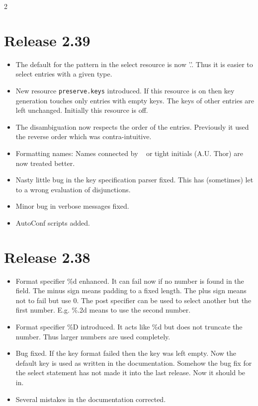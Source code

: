 \documentclass[11pt,a4paper]{scrartcl}
\newcommand\rsc[1]{\texttt{#1}}
\newenvironment{Releases}{\begin{multicols}2\RaggedRight}{\end{multicols}}
\newenvironment{Release}[2]{%
  \def\tmp{#2}%
  \section*{Release #1 \ifx\tmp\empty\else{\normalsize[#2]}\fi}
  \begin{itemize}
}{\end{itemize}}
\newenvironment{Fix}[1]{\item }{}
\newenvironment{New}[1]{\item }{}
\newenvironment{Doc}[1]{\item }{}
\newenvironment{Update}[1]{\item }{}
\begin{document}
\begin{Releases}
 \begin{Release}{2.39}{}
  \begin{Update}{gene}
    The default for the pattern in the select resource is now '.'.
    Thus it is easier to select entries with a given type.
  \end{Update}
  \begin{New}{gene}
    New resource \rsc{preserve.keys} introduced. If this resource is on
    then key generation touches only entries with empty keys. The keys of
    other entries are left unchanged. Initially this resource is off.
  \end{New}
  \begin{Update}{gene}
    The disambiguation now respects the order of the entries. Previously it
    used the reverse order which was contra-intuitive.
  \end{Update}
  \begin{Update}{gene}
    Formatting names: Names connected by ~ or tight initials (A.U. Thor) are
    now treated better.
  \end{Update}
  \begin{Fix}{gene}
    Nasty little bug in the key specification parser fixed. This has
    (sometimes) let to a wrong evaluation of disjunctions.
  \end{Fix}
  \begin{Fix}{gene}
    Minor bug in verbose messages fixed.
  \end{Fix}
  \begin{New}{gene}
    AutoConf scripts added.
  \end{New}
 \end{Release}

 \begin{Release}{2.38}{}
  \begin{New}{gene}
    Format specifier \%d enhanced. It can fail now if no number is found in
    the field. The minus sign means padding to a fixed length. The plus sign
    means not to fail but use 0. The post specifier can be used to select
    another but the first number. E.g. \%.2d means to use the second number.
  \end{New}
  \begin{New}{gene}
    Format specifier \%D introduced. It acts like \%d but does not truncate
    the number. Thus larger numbers are used completely.
  \end{New}
  \begin{Fix}{gene}
    Bug fixed. If the key format failed then the key was left empty. Now the
    default key is used as written in the documentation. Somehow the bug fix
    for the select statement has not made it into the last release. Now it
    should be in.
  \end{Fix}
  \begin{Doc}{gene}
    Several mistakes in the documentation corrected.
  \end{Doc}
 \end{Release}


\end{Releases}
\end{document}
